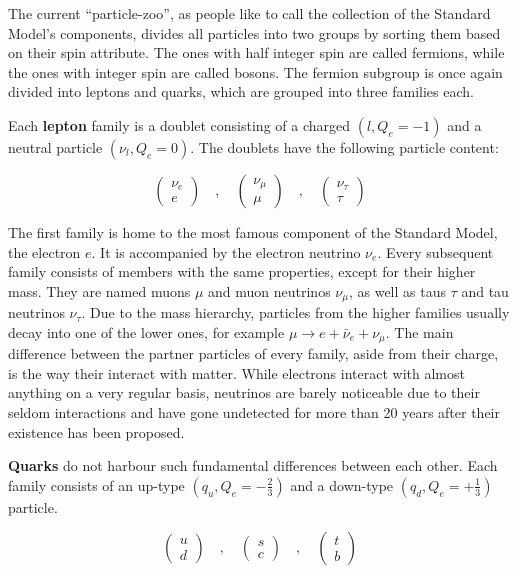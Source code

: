 \noindent The current ``particle-zoo'', as people like to call the collection of the Standard Model's components, divides all particles into two groups by sorting them based on their spin attribute. The ones with half integer spin are called fermions, while the ones with integer spin are called bosons. The fermion subgroup is once again divided into leptons and quarks, which are grouped into three families each.

Each \textbf{lepton} family is a doublet consisting of a charged $( l, Q_e = -1 )$ and a neutral particle $( \nu_l, Q_e = 0 )$. The doublets have the following particle content:

\begin{equation*}
  \begin{pmatrix}
    \nu_e \\
    e
  \end{pmatrix}
  \quad , \quad
  \begin{pmatrix}
    \nu_\mu \\
    \mu
  \end{pmatrix}
  \quad , \quad
  \begin{pmatrix}
    \nu_\tau \\
    \tau
  \end{pmatrix}
\end{equation*}

The first family is home to the most famous component of the Standard Model, the electron $e$. It is accompanied by the electron neutrino $\nu_e$. Every subsequent family consists of members with the same properties, except for their higher mass. They are named muons $\mu$ and muon neutrinos $\nu_\mu$, as well as taus $\tau$ and tau neutrinos $\nu_\tau$. Due to the mass hierarchy, particles from the higher families usually decay into one of the lower ones, for example $\mu \rightarrow e + \bar{\nu}_e + \nu_\mu$. The main difference between the partner particles of every family, aside from their charge, is the way their interact with matter. While electrons interact with almost anything on a very regular basis, neutrinos are barely noticeable due to their seldom interactions and have gone undetected for more than 20 years after their existence has been proposed.

\textbf{Quarks} do not harbour such fundamental differences between each other. Each family consists of an up-type $( q_u, Q_e = -\frac{2}{3} )$ and a down-type $( q_d, Q_e = +\frac{1}{3} )$ particle. 

\begin{equation*}
  \begin{pmatrix}
    u \\
    d
  \end{pmatrix}
  \quad , \quad
  \begin{pmatrix}
    s \\
    c
  \end{pmatrix}
  \quad , \quad
  \begin{pmatrix}
    t \\
    b
  \end{pmatrix}
\end{equation*}

